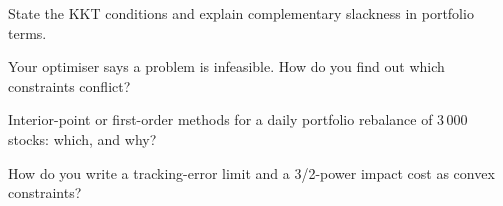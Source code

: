 \begin{interviewq}\label{iq:qm:convex-optimisation:3}
State the KKT conditions and explain complementary slackness in portfolio terms.
\end{interviewq}

\begin{interviewq}\label{iq:qm:convex-optimisation:4}
Your optimiser says a problem is infeasible. How do you find out which constraints conflict?
\end{interviewq}

\begin{interviewq}\label{iq:qm:convex-optimisation:5}
Interior-point or first-order methods for a daily portfolio rebalance of 3\,000 stocks: which, and why?
\end{interviewq}

\begin{interviewq}\label{iq:qm:convex-optimisation:6}
How do you write a tracking-error limit and a 3/2-power impact cost as convex constraints?
\end{interviewq}
